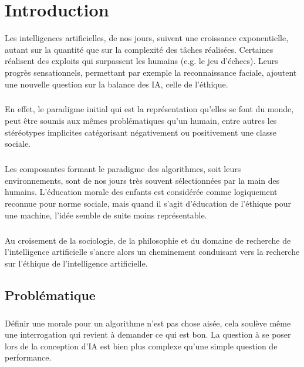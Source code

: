 \documentclass[10pt, french, a4paper]{report}
\begin{document}

\newpage
\chapter*{Introduction}

Les intelligences artificielles, de nos jours, suivent une croissance exponentielle, autant sur la quantité que sur la complexité des tâches réalisées. Certaines réalisent des exploits qui surpassent les humains (e.g. le jeu d’échecs). Leurs progrès sensationnels, permettant par exemple la reconnaissance faciale, ajoutent une nouvelle question sur la balance des IA, celle de l’éthique.

\paragraph{}
En effet, le paradigme initial qui est la représentation qu’elles se font du monde, peut être soumis aux mêmes problématiques qu’un humain, entre autres les stéréotypes implicites catégorisant négativement ou positivement une classe sociale.

\paragraph{}
Les composantes formant le paradigme des algorithmes, soit leurs environnements, sont de nos jours très souvent sélectionnées par la main des humains. L’éducation morale des enfants est considérée comme logiquement reconnue pour norme sociale, mais quand il s’agit d’éducation de l’éthique pour une machine, l’idée semble de suite moins représentable.

\paragraph{}
Au croisement de la sociologie, de la philosophie et du domaine de recherche de l’intelligence artificielle s’ancre alors un cheminement conduisant vers la recherche sur l’éthique de l’intelligence artificielle.


\section*{Problématique} 

\paragraph{}
Définir une morale pour un algorithme n’est pas chose aisée, cela soulève même une interrogation qui revient à demander ce qui est bon. La question à se poser lors de la conception d’IA est bien plus complexe qu’une simple question de performance.
\end{document}
